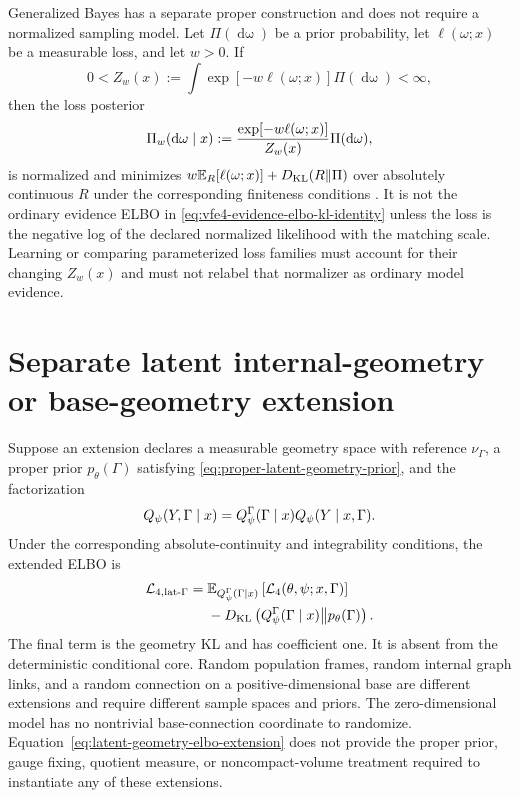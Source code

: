 Generalized Bayes has a separate proper construction and does not require a normalized sampling model. Let $\Pi(\mathop{\mathrm d\omega})$ be a prior probability, let $\ell(\omega;x)$ be a measurable loss, and let $w>0$. If
\begin{equation}
0<Z_w(x):=\int\exp[-w\ell(\omega;x)]\Pi(\mathop{\mathrm d\omega})<\infty,
\label{eq:generalized-bayes-finite-normalizer}
\end{equation}
then the loss posterior
\begin{equation}
\Pi_w(\mathop{\mathrm d\omega}\mid x)
:=\frac{\exp[-w\ell(\omega;x)]}{Z_w(x)}
\Pi(\mathop{\mathrm d\omega}),
\label{eq:generalized-bayes-loss-posterior}
\end{equation}
is normalized and minimizes $w\mathbb E_R[\ell(\omega;x)]+D_{\mathrm{KL}}(R\Vert\Pi)$ over absolutely continuous $R$ under the corresponding finiteness conditions \citep{BissiriHolmesWalker2016}. It is not the ordinary evidence ELBO in \cref{eq:vfe4-evidence-elbo-kl-identity} unless the loss is the negative log of the declared normalized likelihood with the matching scale. Learning or comparing parameterized loss families must account for their changing $Z_w(x)$ and must not relabel that normalizer as ordinary model evidence.

\section{Separate latent internal-geometry or base-geometry extension}

Suppose an extension declares a measurable geometry space with reference $\nu_\Gamma$, a proper prior $p_\theta(\Gamma)$ satisfying \cref{eq:proper-latent-geometry-prior}, and the factorization
\begin{equation}
Q_\psi(Y,\Gamma\mid x)
=Q_\psi^\Gamma(\Gamma\mid x)
Q_\psi(Y\mid x,\Gamma).
\label{eq:latent-geometry-recognition-factorization}
\end{equation}
Under the corresponding absolute-continuity and integrability conditions, the extended ELBO is
\begin{equation}
\begin{aligned}
\mathcal L_{4,\mathrm{lat}\text{-}\Gamma}
={}&\mathbb E_{Q_\psi^\Gamma(\Gamma\mid x)}
\left[
\mathcal L_4(\theta,\psi;x,\Gamma)
\right]\\
&-D_{\mathrm{KL}}\left(
Q_\psi^\Gamma(\Gamma\mid x)
\middle\Vert
p_\theta(\Gamma)
\right).
\end{aligned}
\label{eq:latent-geometry-elbo-extension}
\end{equation}
The final term is the geometry KL and has coefficient one. It is absent from the deterministic conditional core. Random population frames, random internal graph links, and a random connection on a positive-dimensional base are different extensions and require different sample spaces and priors. The zero-dimensional model has no nontrivial base-connection coordinate to randomize. Equation~\eqref{eq:latent-geometry-elbo-extension} does not provide the proper prior, gauge fixing, quotient measure, or noncompact-volume treatment required to instantiate any of these extensions.


